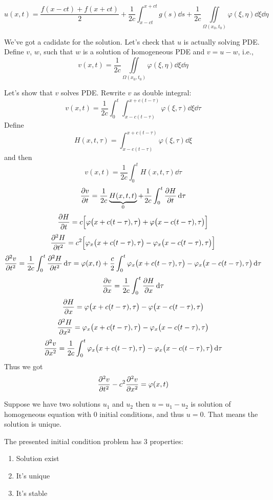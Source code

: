 $$u(x,t) = \frac{f(x-ct) + f(x+ct) }{2} + \frac{1}{2c}\int_{x-ct}^{x+ct} g(s) \dd{s} + \frac{1}{2c}\iint\limits_{\Omega(x_0, t_0)} \varphi(\xi, \eta) \dd{\xi} \dd{\eta}$$

We've got a cadidate for the solution. Let's check that $u$ is actually solving PDE. Define $v$, $w$, such that $w$ is a solution of homogeneous PDE and $v=u-w$, i.e.,
$$v(x,t) = \frac{1}{2c}\iint\limits_{\Omega(x_0, t_0)} \varphi(\xi, \eta) \dd{\xi} \dd{\eta}$$

Let's show that $v$ solves PDE. Rewrite $v$ as double integral:
$$v(x,t) = \frac{1}{2c}\int_0^t \int_{x-c(t-\tau)}^{x+c(t-\tau)} \varphi(\xi, \tau) \dd{\xi} \dd{\tau}$$
Define
$$H(x,t,\tau) = \int_{x-c(t-\tau)}^{x+c(t-\tau)} \varphi(\xi, \tau) \dd{\xi}$$
and then
$$v(x,t) = \frac{1}{2c} \int_0^t H(x,t,\tau) \dd{\tau}$$
$$\pdv{v}{t} = \frac{1}{2c} \underbrace{H(x,t,t)}_{0} +\frac{1}{2c} \int_0^t \pdv{H}{t}(x,t,\tau) \dd{\tau}$$
$$\pdv{H}{t} =c\qty\Big[\varphi\qty\big(x+c(t-\tau), \tau) + \varphi\qty\big(x-c(t-\tau), \tau) ]$$
$$\pdv[2]{H}{t} =c^2\qty\Big[\varphi_x\qty\big(x+c(t-\tau), \tau) - \varphi_x\qty\big(x-c(t-\tau), \tau) ]$$
$$\pdv[2]{v}{t} =\frac{1}{2c} \int_0^t \pdv[2]{H}{t}(x,t,\tau) \dd{\tau} =  \varphi(x,t) + \frac{c}{2} \int_0^t \varphi_x\qty\big(x+c(t-\tau), \tau) - \varphi_x\qty\big(x-c(t-\tau), \tau)  \dd{\tau} $$
$$\pdv{v}{x} = \frac{1}{2c} \int_0^t \pdv{H}{x} \dd{\tau}$$
$$\pdv{H}{x} = \varphi\qty\big(x+c(t-\tau),\tau) - \varphi\qty\big(x-c(t-\tau),\tau)$$
$$\pdv[2]{H}{x} = \varphi_x\qty\big(x+c(t-\tau),\tau) - \varphi_x\qty\big(x-c(t-\tau),\tau)$$
$$\pdv[2]{v}{x} = \frac{1}{2c} \int_0^t \varphi_x\qty\big(x+c(t-\tau),\tau) - \varphi_x\qty\big(x-c(t-\tau),\tau) \dd{\tau}$$
Thus we got
$$\pdv[2]{v}{t} - c^2\pdv[2]{v}{x} = \varphi(x,t)$$

Suppose we have two solutions $u_1$ and $u_2$ then $u=u_1-u_2$ is solution of homogeneous equation with $0$ initial conditions, and thus $u=0$. That means the solution is unique.

The presented initial condition problem has 3 properties:
\begin{enumerate}
	\item Solution exist
	\item It's unique
	\item It's stable
\end{enumerate}
